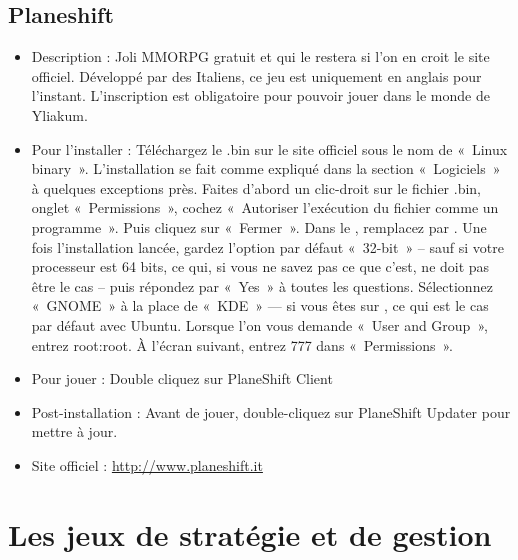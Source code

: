 \subsection{Planeshift}
\begin{itemize}
\begingroup
{}
\item Description : Joli MMORPG gratuit et qui le restera si l'on en croit le site officiel. Développé par des Italiens, ce jeu est uniquement en anglais pour l'instant. L'inscription est obligatoire pour pouvoir jouer dans le monde de Yliakum.{\par}
\endgroup
\item Pour l'installer : Téléchargez le .bin sur le site officiel sous le nom de «~Linux binary~». L'installation se fait comme expliqué dans la section «~Logiciels~» à quelques exceptions près. Faites d'abord un clic-droit sur le fichier .bin, onglet «~Permissions~», cochez  «~Autoriser l'exécution du fichier comme un programme~». Puis cliquez sur «~Fermer~». Dans le , remplacez  par . Une fois l'installation lancée, gardez l'option par défaut «~32-bit~» -- sauf si votre processeur est 64 bits, ce qui, si vous ne savez pas ce que c'est, ne doit pas être le cas -- puis répondez par «~Yes~» à toutes les questions. Sélectionnez «~GNOME~» à la place de «~KDE~» --- si vous êtes sur , ce qui est le cas par défaut avec Ubuntu. Lorsque l'on vous demande «~User and Group~», entrez root:root. À l'écran suivant, entrez 777 dans «~Permissions~».{\par}
\item Pour jouer : Double cliquez sur PlaneShift Client{\par}
\item Post-installation : Avant de jouer, double-cliquez sur PlaneShift Updater pour mettre à jour.{\par}
\item Site officiel : \url{http://www.planeshift.it}{\par}
\end{itemize}
\section{Les jeux de stratégie et de gestion}
